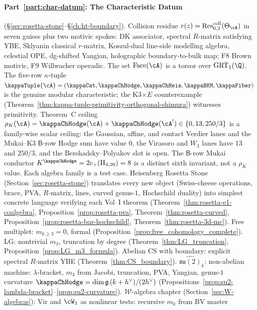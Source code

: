 \paragraph{Part~\ref{part:char-datum}: The Characteristic Datum}
(\S\ref{sec:rosetta-stone}--\S\ref{ch:ht-boundary}).
Collision residue
$r(z) = \mathrm{Res}^{\mathrm{coll}}_{0,2}(\Theta_\cA)$ in seven
guises plus two motivic spokes: DK associator, spectral
$R$-matrix satisfying YBE, Sklyanin classical $r$-matrix,
Koszul-dual line-side modelling algebra, celestial OPE,
dg-shifted Yangian, holographic boundary-to-bulk map; F8 Brown
motivic, F9 Willwacher operadic. The set
$\operatorname{Face}(\cA)$ is a torsor over $\mathrm{GRT}_1(\Q)$.
The five-row $\kappa$-tuple
$\kappaTuple{\cA} =
(\kappaCat, \kappaChHodge, \kappaChHeis, \kappaBKM, \kappaFiber)$
is the genuine modular characteristic; the K3$\times E$
counterexample
(Theorem~\ref{thm:kappa-tuple-primitivity-orthogonal-shimura})
witnesses primitivity. Theorem~C ceiling
$\rho_K(\cA) = \kappaChHodge(\cA) + \kappaChHodge(\cA^!) \in
\{0, 13, 250/3\}$ is a family-wise scalar ceiling: the
Gaussian, affine, and contact Verdier lanes and the Mukai--K3
\(\mathsf B\)-row Hodge sum have value \(0\), the Virasoro and
\(W_3\) lanes have \(13\) and \(250/3\), and the
Bershadsky--Polyakov slot is open. The \(\mathsf B\)-row Mukai
conductor \(K^{\kappaChHodge} = 2c_+(\mathrm{II}_{4,20}) = 8\)
is a distinct sixth invariant, not a \(\rho_K\) value.
Each algebra family is a test case.
Heisenberg Rosetta Stone
(Section~\ref{sec:rosetta-stone}) translates every new object
(Swiss-cheese operations, brace, PVA, $R$-matrix, lines, curved
genus-$1$, Hochschild duality) into simplest concrete language
verifying each Vol~I theorem
(Theorem~\ref{thm:rosetta-e1-coalgebra},
Proposition~\ref{prop:rosetta-pva},
Theorem~\ref{thm:rosetta-curved},
Proposition~\ref{prop:rosetta-bar-hochschild},
Theorem~\ref{thm:rosetta-3d-mc}). Free multiplet:
$m_{k \geq 3} = 0$, formal
(Proposition~\ref{prop:free_cohomology_complete}). LG:
nontrivial $m_3$, truncation by degree
(Theorem~\ref{thm:LG_truncation},
Proposition~\ref{prop:LG_m3_formula}). Abelian CS with boundary:
explicit spectral $R$-matrix YBE
(Theorem~\ref{thm:CS_boundary}). $\widehat{\mathfrak{su}(2)}_k$:
non-abelian machine: $\lambda$-bracket, $m_3$ from Jacobi,
truncation, PVA, Yangian, genus-$1$ curvature
$\kappaChHodge = \dim\fg\,(k+h^\vee)/(2h^\vee)$
(Propositions~\ref{prop:su2-lambda-bracket}--\ref{prop:su2-curvature}).
$\mathcal{W}$-algebra chapter
(Section~\ref{sec:W-algebras}): Vir and $\cW_3$ as nonlinear
tests: recursive $m_k$ from BV master
